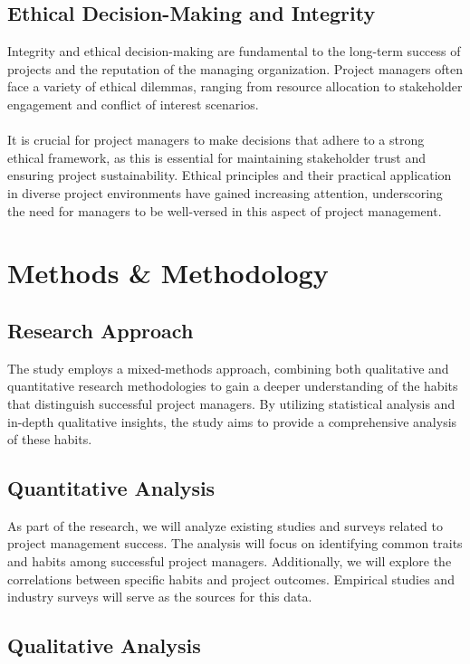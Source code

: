 \documentclass{article}
\begin{document}
\subsection{Ethical Decision-Making and Integrity}
Integrity and ethical decision-making are fundamental to the long-term success of projects and the reputation of the managing organization. Project managers often face a variety of ethical dilemmas, ranging from resource allocation to stakeholder engagement and conflict of interest scenarios. \\\\It is crucial for project managers to make decisions that adhere to a strong ethical framework, as this is essential for maintaining stakeholder trust and ensuring project sustainability. Ethical principles and their practical application in diverse project environments have gained increasing attention, underscoring the need for managers to be well-versed in this aspect of project management\cite{Project_Management_Techniques}.


\newpage
\section{Methods \& Methodology}
\subsection{Research Approach}
The study employs a mixed-methods approach, combining both qualitative and quantitative research methodologies to gain a deeper understanding of the habits that distinguish successful project managers. By utilizing statistical analysis and in-depth qualitative insights, the study aims to provide a comprehensive analysis of these habits.
\subsection{Quantitative Analysis}
As part of the research, we will analyze existing studies and surveys related to project management success. The analysis will focus on identifying common traits and habits among successful project managers. Additionally, we will explore the correlations between specific habits and project outcomes. Empirical studies and industry surveys will serve as the sources for this data.\cite{relationship_between_project_manage}
\subsection{Qualitative Analysis}
\end{document}
